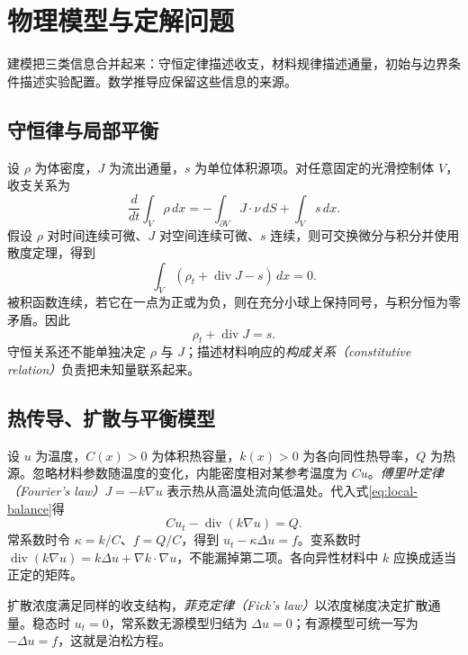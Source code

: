 \setcounter{chapter}{1} %
\chapter{物理模型与定解问题}
\label{chap:modeling}

建模把三类信息合并起来：守恒定律描述收支，材料规律描述通量，初始与边界条件描述实验配置。数学推导应保留这些信息的来源。

\section{守恒律与局部平衡}
设 $\rho$ 为体密度，$J$ 为流出通量，$s$ 为单位体积源项。对任意固定的光滑控制体 $V$，收支关系为
\begin{equation}
 \frac{d}{dt}\int_V\rho\,dx
 =-\int_{\partial V}J\cdot\nu\,dS+\int_Vs\,dx.
 \label{eq:balance-integral}
\end{equation}
假设 $\rho$ 对时间连续可微、$J$ 对空间连续可微、$s$ 连续，则可交换微分与积分并使用散度定理，得到
\[
 \int_V(\rho_t+\operatorname{div}J-s)\,dx=0.
\]
被积函数连续，若它在一点为正或为负，则在充分小球上保持同号，与积分恒为零矛盾。因此
\begin{equation}
 \rho_t+\operatorname{div}J=s.
 \label{eq:local-balance}
\end{equation}
守恒关系还不能单独决定 $\rho$ 与 $J$；描述材料响应的\emph{构成关系（constitutive relation）}负责把未知量联系起来。

\section{热传导、扩散与平衡模型}
设 $u$ 为温度，$C(x)>0$ 为体积热容量，$k(x)>0$ 为各向同性热导率，$Q$ 为热源。忽略材料参数随温度的变化，内能密度相对某参考温度为 $Cu$。\emph{傅里叶定律（Fourier's law）}$J=-k\nabla u$ 表示热从高温处流向低温处。代入式\eqref{eq:local-balance}得
\begin{equation}
 C u_t-\operatorname{div}(k\nabla u)=Q.
 \label{eq:heat-model}
\end{equation}
常系数时令 $\kappa=k/C$、$f=Q/C$，得到 $u_t-\kappa\Delta u=f$。变系数时 $\operatorname{div}(k\nabla u)=k\Delta u+\nabla k\cdot\nabla u$，不能漏掉第二项。各向异性材料中 $k$ 应换成适当正定的矩阵。

扩散浓度满足同样的收支结构，\emph{菲克定律（Fick's law）}以浓度梯度决定扩散通量。稳态时 $u_t=0$，常系数无源模型归结为 $\Delta u=0$；有源模型可统一写为 $-\Delta u=f$，这就是泊松方程。

